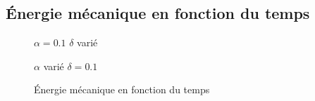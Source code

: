 \documentclass{article}
\begin{document}
\subsection{Énergie mécanique en fonction du temps}
\begin{figure}[H]
	\begin{minipage}[H]{0.49\linewidth}
		{$\alpha=0.1$ $\delta$ varié}
	\end{minipage}
	\hfill
	\begin{minipage}[H]{0.49\linewidth}
		{$\alpha$ varié $\delta=0.1$}
	\end{minipage}
	\caption{Énergie mécanique en fonction du temps}
\end{figure}
\end{document}
